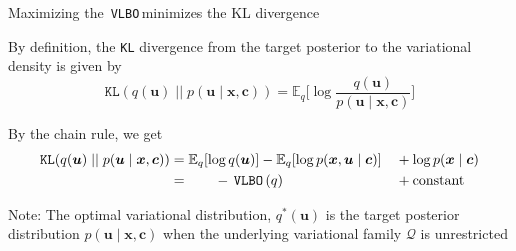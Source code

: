 \documentclass[10pt]{beamer}
\newcommand{\df}{\displaystyle\frac}
\newcommand{\+}[1]{\ensuremath{{\boldsymbol #1}}} %
\newcommand{\cond}{\; | \;}
\newcommand{\E}{\mathbb{E}}
\newcommand{\Q}{\mathcal{Q}}
\newcommand{\VLBO}{\,\texttt{VLBO}\,}
\begin{document}
\begin{frame}{Maximizing the \VLBO minimizes the KL divergence}  


By definition, the \texttt{KL} divergence from the target posterior to the variational density is given by
\begin{equation*}
\texttt{KL} (q(\+u) \; || \; p(\+u \cond \+x, \+c)) =  \E_q \bigg[\log \df{q(\+u )}{p(\+u \cond \+x, \+c)} \bigg] 
\end{equation*}

 


By the chain rule, we get 
\begin{align*} 
 \texttt{KL} (q(\+u) \; || \; p(\+u \cond \+x, \+c)) & =  \E_q[\log q(\+u )]  - \E_q[ \log p(\+x,\+u \cond \+c)] &&+\log p(\+x \cond \+c) \\
 & = \hphantom{blah} -\VLBO(q)  && +  \text{constant} 
 \end{align*}
 

 

\alert{Note}: The optimal variational distribution, $q^*(\+u)$ is the target posterior distribution $p(\+u \cond \+x, \+c)$ when the underlying variational family $\Q$ is unrestricted  


\end{frame}
\end{document}
